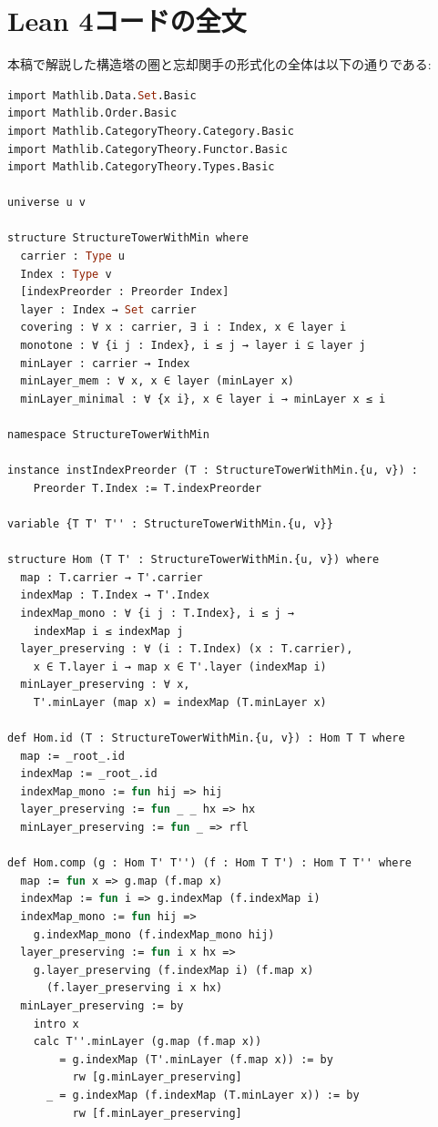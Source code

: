 \documentclass[a4paper,12pt]{article}
\theoremstyle{definition}
\begin{document}
\appendix

\section{Lean 4コードの全文}

本稿で解説した構造塔の圏と忘却関手の形式化の全体は以下の通りである:

\begin{lstlisting}[style=leanstyle, language=ML]
import Mathlib.Data.Set.Basic
import Mathlib.Order.Basic
import Mathlib.CategoryTheory.Category.Basic
import Mathlib.CategoryTheory.Functor.Basic
import Mathlib.CategoryTheory.Types.Basic

universe u v

structure StructureTowerWithMin where
  carrier : Type u
  Index : Type v
  [indexPreorder : Preorder Index]
  layer : Index → Set carrier
  covering : ∀ x : carrier, ∃ i : Index, x ∈ layer i
  monotone : ∀ {i j : Index}, i ≤ j → layer i ⊆ layer j
  minLayer : carrier → Index
  minLayer_mem : ∀ x, x ∈ layer (minLayer x)
  minLayer_minimal : ∀ {x i}, x ∈ layer i → minLayer x ≤ i

namespace StructureTowerWithMin

instance instIndexPreorder (T : StructureTowerWithMin.{u, v}) : 
    Preorder T.Index := T.indexPreorder

variable {T T' T'' : StructureTowerWithMin.{u, v}}

structure Hom (T T' : StructureTowerWithMin.{u, v}) where
  map : T.carrier → T'.carrier
  indexMap : T.Index → T'.Index
  indexMap_mono : ∀ {i j : T.Index}, i ≤ j → 
    indexMap i ≤ indexMap j
  layer_preserving : ∀ (i : T.Index) (x : T.carrier),
    x ∈ T.layer i → map x ∈ T'.layer (indexMap i)
  minLayer_preserving : ∀ x, 
    T'.minLayer (map x) = indexMap (T.minLayer x)

def Hom.id (T : StructureTowerWithMin.{u, v}) : Hom T T where
  map := _root_.id
  indexMap := _root_.id
  indexMap_mono := fun hij => hij
  layer_preserving := fun _ _ hx => hx
  minLayer_preserving := fun _ => rfl

def Hom.comp (g : Hom T' T'') (f : Hom T T') : Hom T T'' where
  map := fun x => g.map (f.map x)
  indexMap := fun i => g.indexMap (f.indexMap i)
  indexMap_mono := fun hij => 
    g.indexMap_mono (f.indexMap_mono hij)
  layer_preserving := fun i x hx =>
    g.layer_preserving (f.indexMap i) (f.map x) 
      (f.layer_preserving i x hx)
  minLayer_preserving := by
    intro x
    calc T''.minLayer (g.map (f.map x))
        = g.indexMap (T'.minLayer (f.map x)) := by 
          rw [g.minLayer_preserving]
      _ = g.indexMap (f.indexMap (T.minLayer x)) := by 
          rw [f.minLayer_preserving]


\end{lstlisting}
\end{document}
